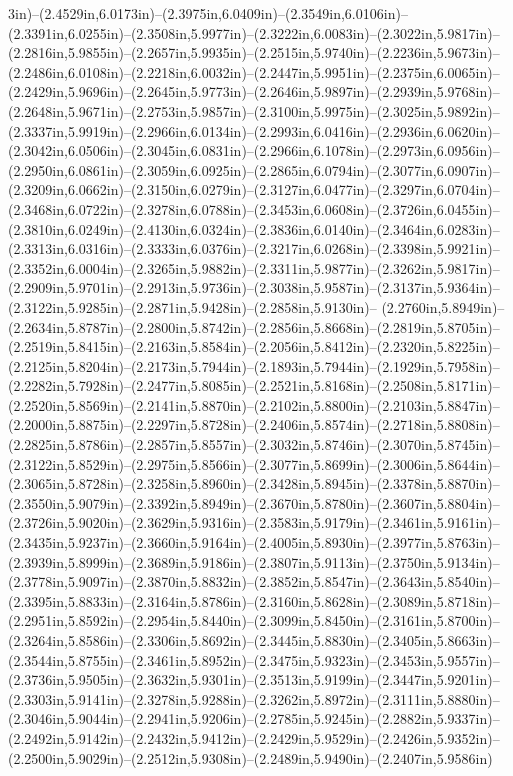 3in)--(2.4529in,6.0173in)--(2.3975in,6.0409in)--(2.3549in,6.0106in)--(2.3391in,6.0255in)--(2.3508in,5.9977in)--(2.3222in,6.0083in)--(2.3022in,5.9817in)--(2.2816in,5.9855in)--(2.2657in,5.9935in)--(2.2515in,5.9740in)--(2.2236in,5.9673in)--(2.2486in,6.0108in)--(2.2218in,6.0032in)--(2.2447in,5.9951in)--(2.2375in,6.0065in)--(2.2429in,5.9696in)--(2.2645in,5.9773in)--(2.2646in,5.9897in)--(2.2939in,5.9768in)--(2.2648in,5.9671in)--(2.2753in,5.9857in)--(2.3100in,5.9975in)--(2.3025in,5.9892in)--(2.3337in,5.9919in)--(2.2966in,6.0134in)--(2.2993in,6.0416in)--(2.2936in,6.0620in)--(2.3042in,6.0506in)--(2.3045in,6.0831in)--(2.2966in,6.1078in)--(2.2973in,6.0956in)--(2.2950in,6.0861in)--(2.3059in,6.0925in)--(2.2865in,6.0794in)--(2.3077in,6.0907in)--(2.3209in,6.0662in)--(2.3150in,6.0279in)--(2.3127in,6.0477in)--(2.3297in,6.0704in)--(2.3468in,6.0722in)--(2.3278in,6.0788in)--(2.3453in,6.0608in)--(2.3726in,6.0455in)--(2.3810in,6.0249in)--(2.4130in,6.0324in)--(2.3836in,6.0140in)--(2.3464in,6.0283in)--(2.3313in,6.0316in)--(2.3333in,6.0376in)--(2.3217in,6.0268in)--(2.3398in,5.9921in)--(2.3352in,6.0004in)--(2.3265in,5.9882in)--(2.3311in,5.9877in)--(2.3262in,5.9817in)--(2.2909in,5.9701in)--(2.2913in,5.9736in)--(2.3038in,5.9587in)--(2.3137in,5.9364in)--(2.3122in,5.9285in)--(2.2871in,5.9428in)--(2.2858in,5.9130in)--
(2.2760in,5.8949in)--(2.2634in,5.8787in)--(2.2800in,5.8742in)--(2.2856in,5.8668in)--(2.2819in,5.8705in)--(2.2519in,5.8415in)--(2.2163in,5.8584in)--(2.2056in,5.8412in)--(2.2320in,5.8225in)--(2.2125in,5.8204in)--(2.2173in,5.7944in)--(2.1893in,5.7944in)--(2.1929in,5.7958in)--(2.2282in,5.7928in)--(2.2477in,5.8085in)--(2.2521in,5.8168in)--(2.2508in,5.8171in)--(2.2520in,5.8569in)--(2.2141in,5.8870in)--(2.2102in,5.8800in)--(2.2103in,5.8847in)--(2.2000in,5.8875in)--(2.2297in,5.8728in)--(2.2406in,5.8574in)--(2.2718in,5.8808in)--(2.2825in,5.8786in)--(2.2857in,5.8557in)--(2.3032in,5.8746in)--(2.3070in,5.8745in)--(2.3122in,5.8529in)--(2.2975in,5.8566in)--(2.3077in,5.8699in)--(2.3006in,5.8644in)--(2.3065in,5.8728in)--(2.3258in,5.8960in)--(2.3428in,5.8945in)--(2.3378in,5.8870in)--(2.3550in,5.9079in)--(2.3392in,5.8949in)--(2.3670in,5.8780in)--(2.3607in,5.8804in)--(2.3726in,5.9020in)--(2.3629in,5.9316in)--(2.3583in,5.9179in)--(2.3461in,5.9161in)--(2.3435in,5.9237in)--(2.3660in,5.9164in)--(2.4005in,5.8930in)--(2.3977in,5.8763in)--(2.3939in,5.8999in)--(2.3689in,5.9186in)--(2.3807in,5.9113in)--(2.3750in,5.9134in)--(2.3778in,5.9097in)--(2.3870in,5.8832in)--(2.3852in,5.8547in)--(2.3643in,5.8540in)--(2.3395in,5.8833in)--(2.3164in,5.8786in)--(2.3160in,5.8628in)--(2.3089in,5.8718in)--(2.2951in,5.8592in)--(2.2954in,5.8440in)--(2.3099in,5.8450in)--(2.3161in,5.8700in)--(2.3264in,5.8586in)--(2.3306in,5.8692in)--(2.3445in,5.8830in)--(2.3405in,5.8663in)--(2.3544in,5.8755in)--(2.3461in,5.8952in)--(2.3475in,5.9323in)--(2.3453in,5.9557in)--(2.3736in,5.9505in)--(2.3632in,5.9301in)--(2.3513in,5.9199in)--(2.3447in,5.9201in)--(2.3303in,5.9141in)--(2.3278in,5.9288in)--(2.3262in,5.8972in)--(2.3111in,5.8880in)--(2.3046in,5.9044in)--(2.2941in,5.9206in)--(2.2785in,5.9245in)--(2.2882in,5.9337in)--(2.2492in,5.9142in)--(2.2432in,5.9412in)--(2.2429in,5.9529in)--(2.2426in,5.9352in)--(2.2500in,5.9029in)--(2.2512in,5.9308in)--(2.2489in,5.9490in)--(2.2407in,5.9586in)
